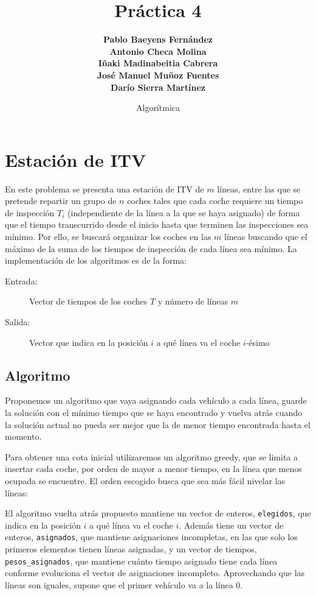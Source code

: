 \documentclass[a4paper, 11pt]{article}
\title{\Huge \textbf{Práctica 4}}
\author{\textbf{Pablo Baeyens Fernández} \\ \textbf{Antonio Checa Molina} \\
	\textbf{Iñaki Madinabeitia Cabrera} \\  \textbf{José Manuel Muñoz Fuentes} \\
	\textbf{Darío Sierra Martínez} \\ }
\date{Algorítmica}
\begin{document}
	\maketitle
	\tableofcontents
	\newpage

\section{Estación de ITV}

En este problema se presenta una estación de ITV de $m$ líneas, entre las que
se pretende repartir un grupo de $n$ coches tales que cada coche requiere un
tiempo de inspección $T_i$ (independiente de la línea a la que se haya asignado)
de forma que el tiempo transcurrido desde el inicio hasta que terminen las
inspecciones sea mínimo. Por ello, se buscará organizar los coches en las $m$
líneas buscando que el máximo de la suma de los tiempos de inspección de cada
línea sea mínimo. La implementación de los algoritmos es de la forma:
\begin{description}
	\item[Entrada:] Vector de tiempos de los coches $T$ y número de líneas $m$
	\item[Salida:] Vector que indica en la posición $i$ a qué línea va el coche $i$-ésimo
\end{description}

\subsection{Algoritmo}

Proponemos un algoritmo que vaya asignando cada vehículo a cada línea, guarde la solución con el mínimo tiempo que se haya encontrado y vuelva atrás cuando la solución actual no pueda ser mejor que la de menor tiempo encontrada hasta el momento.

Para obtener una cota inicial utilizaremos un algoritmo greedy, que se limita a insertar cada coche, por orden de mayor a menor tiempo, en la línea que menos ocupada se encuentre. El orden escogido busca que sea más fácil nivelar las líneas:


El algoritmo vuelta atrás propuesto mantiene un vector de enteros, \texttt{elegidos}, que indica en la posición $i$ a qué línea va el coche $i$. Además tiene un vector de enteros, \texttt{asignados}, que mantiene asignaciones incompletas, en las que solo los primeros elementos tienen líneas asignadas, y un vector de tiempos, \texttt{pesos\_asignados}, que mantiene cuánto tiempo asignado tiene cada línea conforme evoluciona el vector de asignaciones incompleto. Aprovechando que las líneas son iguales, supone que el primer vehículo va a la línea 0.
\end{document}
